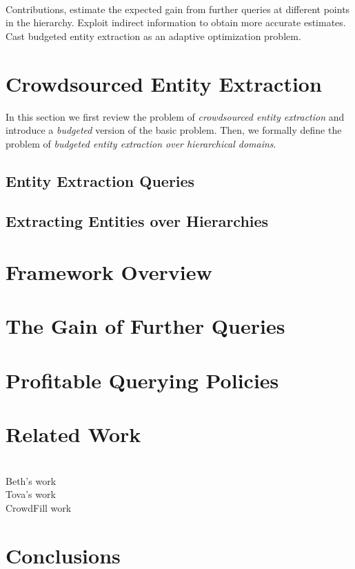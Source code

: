 \documentclass{sig-alternate}
\begin{document}
\ \\Contributions, estimate the expected gain from further queries at different points in the hierarchy. Exploit indirect information to obtain more accurate estimates. Cast budgeted entity extraction as an adaptive optimization problem. 


\section{Crowdsourced Entity Extraction}
In this section we first review the problem of {\em crowdsourced entity extraction} and introduce a {\em budgeted} version of the basic problem. Then, we formally define the problem of {\em budgeted entity extraction over hierarchical domains}. 

\subsection{Entity Extraction Queries}

\subsection{Extracting Entities over Hierarchies}

\section{Framework Overview}
\subsection{}
\subsection{}
\subsection{}

\section{The Gain of Further Queries}

\section{Profitable Querying Policies}

\section{Related Work}

\ \\Beth's work
\ \\Tova's work
\ \\CrowdFill work

\section{Conclusions}




\end{document}
